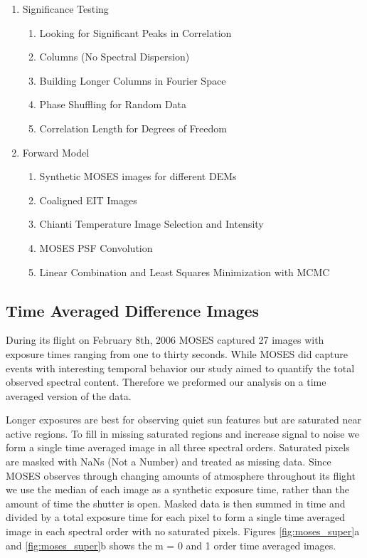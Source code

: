 \documentclass[]{solarphysics}
\begin{document}
\begin{article}
\begin{enumerate}
			\item Significance Testing
				\begin{enumerate}
					\item Looking for Significant Peaks in Correlation
					\item Columns (No Spectral Dispersion)
					\item Building Longer Columns in Fourier Space
					\item Phase Shuffling for Random Data
					\item Correlation Length for Degrees of Freedom
				\end{enumerate}
			
			\item Forward Model
				\begin{enumerate}
					\item Synthetic MOSES images for different DEMs
					\item Coaligned EIT Images
					\item Chianti Temperature Image Selection and Intensity
					\item MOSES PSF Convolution
					\item Linear Combination and Least Squares Minimization with MCMC
				\end{enumerate}
		\end{enumerate}
	

	
 		
 	\subsection{Time Averaged Difference Images}	
 	
 	During its flight on February 8th, 2006 MOSES captured 27 images with exposure times ranging from one to thirty seconds. While MOSES did capture events with interesting temporal behavior \citep{Fox2010,Rust2017} our study aimed to quantify the total observed spectral content. Therefore we preformed our analysis on a time averaged version of the data.
 	
 	Longer exposures are best for observing quiet sun features but are saturated near active regions.  To fill in missing saturated regions and increase signal to noise we form a single time averaged image in all three spectral orders. Saturated pixels are masked with NaNs (Not a Number) and treated as missing data. Since MOSES observes through changing amounts of atmosphere throughout its flight we use the median of each image as a synthetic exposure time, rather than the amount of time the shutter is open.  %
 	Masked data is then summed in time and divided by a total exposure time for each pixel to form a single time averaged image in each spectral order with no saturated pixels.  Figures \ref{fig:moses_super}a and \ref{fig:moses_super}b shows the m = 0 and 1 order time averaged images. 
 	

\end{article}
\end{document}
